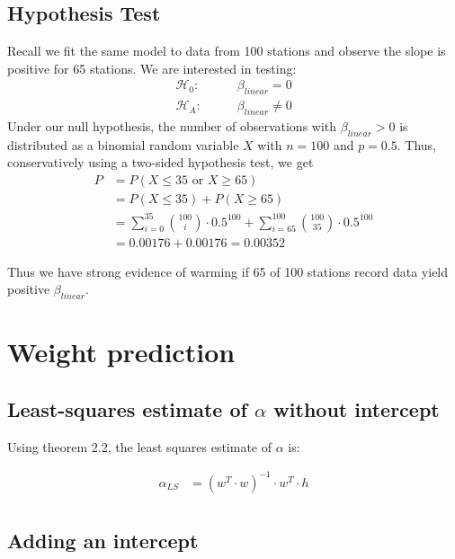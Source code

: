 \documentclass[paper=a4, fontsize=11pt]{scrartcl} %
\numberwithin{equation}{section} %
\numberwithin{figure}{section} %
\numberwithin{table}{section} %
\begin{document}
\subsection{Hypothesis Test}

Recall we fit the same model to data from 100 stations and observe the slope is positive for 65 stations. We are interested in testing:
\begin{align*}
\mathcal{H}_0: & \qquad{}  \beta_{linear} = 0 \\
\mathcal{H}_A: & \qquad{} \beta_{linear} \ne 0
\end{align*}
Under our null hypothesis, the number of observations with $\beta_{linear} > 0$ is distributed as a binomial random variable $X$ with $n = 100$ and $p = 0.5$. Thus, conservatively using a two-sided hypothesis test, we get
\begin{align*}
P &= P(X \leq 35 \textrm{ or } X\geq 65) \\
   &= P(X \leq 35) + P(X \geq 65) \\ 
   &= \sum_{i = 0}^{35}{100 \choose i} \cdot 0.5^{100} + \sum_{i = 65}^{100}{100 \choose 35} \cdot 0.5^{100} \\
   &= 0.00176 + 0.00176 = 0.00352
\end{align*} 

Thus we have strong evidence of warming if 65 of 100 stations record data yield positive $\beta_{linear}$.


\section{Weight prediction}

\subsection{Least-squares estimate of $\alpha$ without intercept}

Using theorem 2.2, the least squares estimate of $\alpha$ is:

\begin{align*}
\alpha_{LS} &= (w^T \cdot w)^{-1}\cdot w^T \cdot h \\
\end{align*}

\subsection{Adding an intercept}
\end{document}
